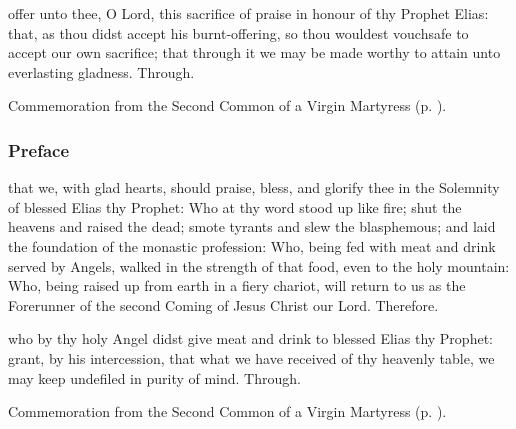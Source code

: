 
\secret
{} offer unto thee, O Lord, this sacrifice of praise in honour of thy Prophet Elias: that, as thou didst accept his burnt-offering, so thou wouldest vouchsafe to accept our own sacrifice; that through it we may be made worthy to attain unto everlasting gladness. Through.
\begin{rubric}
	Commemoration  from the Second Common of a Virgin Martyress (p. \pageref{CommonVirginMartyrII}).
\end{rubric}

\subsubsection{Preface}
 that we, with glad hearts, should praise, bless, and glorify thee in the Solemnity of blessed Elias thy Prophet: Who at thy word stood up like fire; shut the heavens and raised the dead; smote tyrants and slew the blasphemous; and laid the foundation of the monastic profession: Who, being fed with meat and drink served by Angels, walked in the strength of that food, even to the holy mountain: Who, being raised up from earth in a fiery chariot, will return to us as the Forerunner of the second Coming of Jesus Christ our Lord. Therefore.


\clearpage
\postcommunion
{} who by thy holy Angel didst give meat and drink to blessed Elias thy Prophet: grant, by his intercession, that what we have received of thy heavenly table, we may keep undefiled in purity of mind. Through.
\begin{rubric}
	Commemoration  from the Second Common of a Virgin Martyress (p. \pageref{CommonVirginMartyrII}).
\end{rubric}



